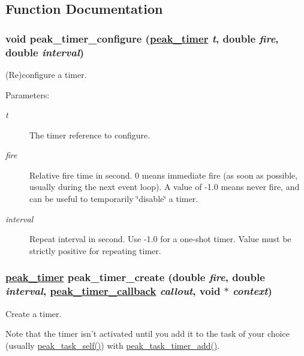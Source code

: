 \subsection{Function Documentation}
\hypertarget{group__timer_ga3}{
\subsubsection[peak\_\-timer\_\-configure]{\setlength{\rightskip}{0pt plus 5cm}void peak\_\-timer\_\-configure (\hyperlink{group__timer_ga0}{peak\_\-timer} {\em t}, double {\em fire}, double {\em interval})}}
\label{group__timer_ga3}


(Re)configure a timer. 

\begin{Desc}
\item[Parameters:]
\begin{description}
\item[{\em t}]The timer reference to configure. \item[{\em fire}]Relative fire time in second. 0 means immediate fire (as soon as possible, usually during the next event loop). A value of -1.0 means never fire, and can be useful to temporarily \char`\"{}disable\char`\"{} a timer. \item[{\em interval}]Repeat interval in second. Use -1.0 for a one-shot timer. Value must be strictly positive for repeating timer. \end{description}
\end{Desc}
\hypertarget{group__timer_ga2}{
\subsubsection[peak\_\-timer\_\-create]{\setlength{\rightskip}{0pt plus 5cm}\hyperlink{group__timer_ga0}{peak\_\-timer} peak\_\-timer\_\-create (double {\em fire}, double {\em interval}, \hyperlink{group__timer_ga1}{peak\_\-timer\_\-callback} {\em callout}, void $\ast$ {\em context})}}
\label{group__timer_ga2}


Create a timer. 

Note that the timer isn't activated until you add it to the task of your choice (usually \hyperlink{group__task__common_ga8}{peak\_\-task\_\-self()}) with \hyperlink{group__task__timer_ga24}{peak\_\-task\_\-timer\_\-add()}.

